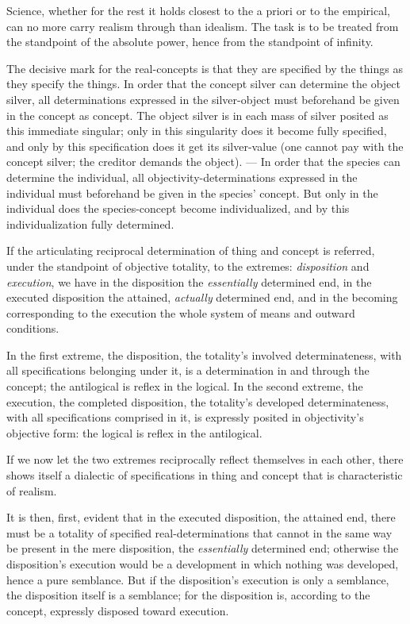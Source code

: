\documentclass[12pt]{book}
\begin{document}
Science, whether for the rest it holds closest to the a priori or to
the empirical, can no more carry realism through than idealism. The
task is to be treated from the standpoint of the absolute power,
hence from the standpoint of infinity.

The decisive mark for the real-concepts is that they are specified
by the things as they specify the things. In order that the concept
silver can determine the object silver, all determinations expressed
in the silver-object must beforehand be given in the concept as
concept. The object silver is in each mass of silver posited as this
immediate singular; only in this singularity does it become fully
specified, and only by this specification does it get its
silver-value (one cannot pay with the concept silver; the creditor
demands the object). --- In order that the species can determine the
individual, all objectivity-determinations expressed in the
individual must beforehand be given in the species' concept. But
only in the individual does the species-concept become
individualized, and by this individualization fully determined.

If the articulating reciprocal determination of thing and concept is
referred, under the standpoint of objective totality, to the
extremes: \emph{disposition} and \emph{execution}, we have in the
disposition the \emph{essentially} determined end, in the executed
disposition the attained, \emph{actually} determined end, and in the
becoming corresponding to the execution the whole system of means
and outward conditions.

In the first extreme, the disposition, the totality's involved
determinateness, with all specifications belonging under it, is a
determination in and through the concept; the antilogical is reflex
in the logical. In the second extreme, the execution, the completed
disposition, the totality's developed determinateness, with all
specifications comprised in it, is expressly posited in
objectivity's objective form: the logical is reflex in the
antilogical.

If we now let the two extremes reciprocally reflect themselves in
each other, there shows itself a dialectic of specifications in
thing and concept that is characteristic of realism.

It is then, first, evident that in the executed disposition, the
attained end, there must be a totality of specified
real-determinations that cannot in the same way be present in the
mere disposition, the \emph{essentially} determined end;
otherwise the disposition's execution would be a development in
which nothing was developed, hence a pure semblance. But if the
disposition's execution is only a semblance, the disposition itself
is a semblance; for the disposition is, according to the concept,
expressly disposed toward execution.
\end{document}
